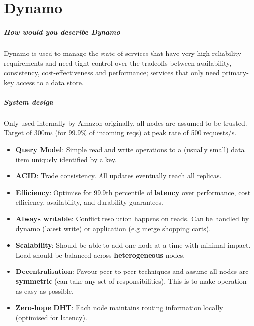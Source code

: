 \chapter{Dynamo}

\paragraph{How would you describe Dynamo} Dynamo is used to manage the state of
services that have very high reliability requirements and need tight control
over the tradeoffs between availability, consistency, cost-effectiveness and
performance; services that only need primary-key access to a data store.

\paragraph{System design} Only used internally by Amazon originally, all nodes
are assumed to be trusted. Target of 300ms (for 99.9\% of incoming reqs) at peak
rate of 500 requests/s.
\begin{itemize}
  \item \textbf{Query Model}: Simple read and write operations to a (usually
    small) data item uniquely identified by a key.
  \item \textbf{ACID}: Trade consistency. All updates eventually reach all
    replicas.
  \item \textbf{Efficiency}: Optimise for 99.9th percentile of \textbf{latency}
    over performance, cost efficiency, availability, and durability guarantees.
  \item \textbf{Always writable}: Conflict resolution happens on reads. Can be
    handled by dynamo (latest write) or application (e.g merge shopping carts).
  \item \textbf{Scalability}: Should be able to add one node at a time with
    minimal impact. Load should be balanced across \textbf{heterogeneous} nodes.
  \item \textbf{Decentralisation}: Favour peer to peer techniques and assume all
    nodes are \textbf{symmetric} (can take any set of responsibilities). This is
    to make operation as easy as possible.
  \item \textbf{Zero-hope DHT}: Each node maintains routing information locally
    (optimised for latency).
\end{itemize}

